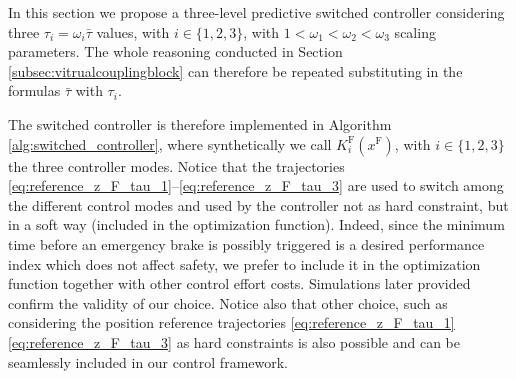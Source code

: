 In this section we propose a three-level predictive switched controller considering three $\tau_i=\omega_i \bar{\tau}$ values, with $i\in \{1,2,3\}$, with $1<\omega_1 < \omega_2< \omega_3$ scaling parameters. The whole reasoning conducted in Section \ref{subsec:vitrualcouplingblock} can therefore be repeated substituting in the formulas $\bar{\tau}$ with $\tau_i$. 

The switched controller is therefore implemented in Algorithm \ref{alg:switched_controller}, where synthetically we call $K^{\mathrm{F}}_i(x^{\mathrm{F}})$, with $i\in \{1,2,3\}$ the three controller modes. Notice that the trajectories \eqref{eq:reference_z_F_tau_1}–\eqref{eq:reference_z_F_tau_3} are used to switch among the different control modes and used by the controller not as hard constraint, but in a soft way (included in the optimization function). Indeed, since the minimum time before an emergency brake is possibly triggered is a desired performance index which does not affect safety, we prefer to include it in the optimization function together with other control effort costs. Simulations later provided confirm the validity of our choice. Notice also that other choice, such as considering the position reference trajectories \eqref{eq:reference_z_F_tau_1} \textemdash{} \eqref{eq:reference_z_F_tau_3} as hard constraints is also possible and can be seamlessly included in our control framework.


